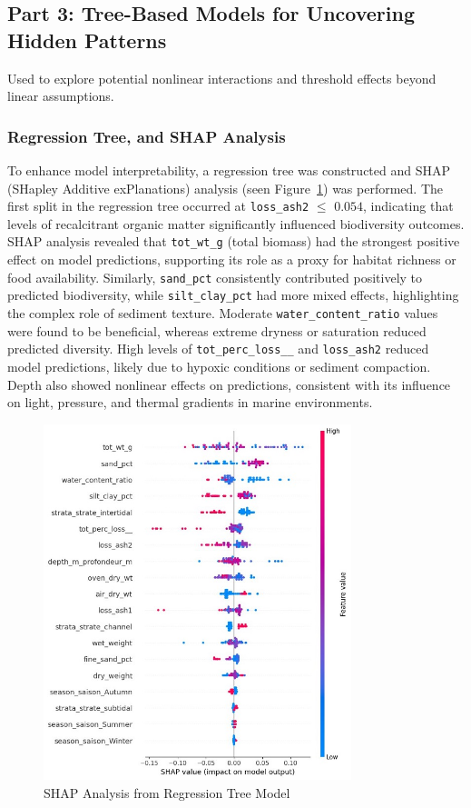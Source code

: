 \documentclass[12pt]{article}
\begin{document}
\subsection{Part 3:  Tree-Based Models for Uncovering Hidden Patterns}

\qquad Used to explore potential nonlinear interactions and threshold effects
beyond linear assumptions.

\subsubsection{Regression Tree, and SHAP Analysis}

\qquad To enhance model interpretability, a regression tree was constructed and
SHAP (SHapley Additive exPlanations) analysis (seen
Figure~\ref{fig:shap-analysis}) was performed. The first split in the regression
tree occurred at \texttt{loss\_ash2} $\leq$ $0.054$, indicating that levels of
recalcitrant organic matter significantly influenced biodiversity outcomes. SHAP
analysis revealed that \texttt{tot\_wt\_g} (total biomass) had the strongest
positive effect on model predictions, supporting its role as a proxy for habitat
richness or food availability. Similarly, \texttt{sand\_pct} consistently
contributed positively to predicted biodiversity, while \texttt{silt\_clay\_pct}
had more mixed effects, highlighting the complex role of sediment texture.
Moderate \texttt{water\_content\_ratio} values were found to be beneficial,
whereas extreme dryness or saturation reduced predicted diversity. High levels
of \texttt{tot\_perc\_loss\_\_} and \texttt{loss\_ash2} reduced model
predictions, likely due to hypoxic conditions or sediment compaction. Depth also
showed nonlinear effects on predictions, consistent with its influence on light,
pressure, and thermal gradients in marine environments.

\begin{figure}[H]
\centering
\includegraphics[width=0.8\textwidth]{SHAP-analysis-from-regression-tree.jpg}
\caption{SHAP Analysis from Regression Tree Model}
\label{fig:shap-analysis}
\end{figure}
\end{document}
